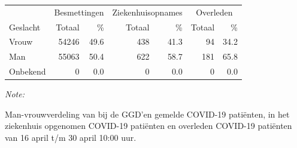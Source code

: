 \documentclass[
  english,
  man,floatsintext]{apa6}
\begin{document}
\begin{table}
\centering\begingroup\fontsize{11}{13}\selectfont

\begin{threeparttable}
\begin{tabular}{lrrrrrr}
\toprule
\multicolumn{1}{c}{ } & \multicolumn{2}{c}{Besmettingen} & \multicolumn{2}{c}{Ziekenhuisopnames} & \multicolumn{2}{c}{Overleden} \\
\cmidrule(l{3pt}r{3pt}){2-3} \cmidrule(l{3pt}r{3pt}){4-5} \cmidrule(l{3pt}r{3pt}){6-7}
Geslacht & Totaal & \% & Totaal & \% & Totaal & \%\\
\midrule
Vrouw & 54246 & 49.6 & 438 & 41.3 & 94 & 34.2\\
Man & 55063 & 50.4 & 622 & 58.7 & 181 & 65.8\\
Onbekend & 0 & 0.0 & 0 & 0.0 & 0 & 0.0\\
\bottomrule
\end{tabular}
\begin{tablenotes}
\item \textit{Note: } 
\item Man-vrouwverdeling van bij de GGD’en gemelde COVID-19 patiënten, in het ziekenhuis opgenomen COVID-19 patiënten en overleden COVID-19 patiënten van 16 april t/m 30 april 10:00 uur.
\end{tablenotes}
\end{threeparttable}
\endgroup{}
\end{table}
\newpage
\end{document}

